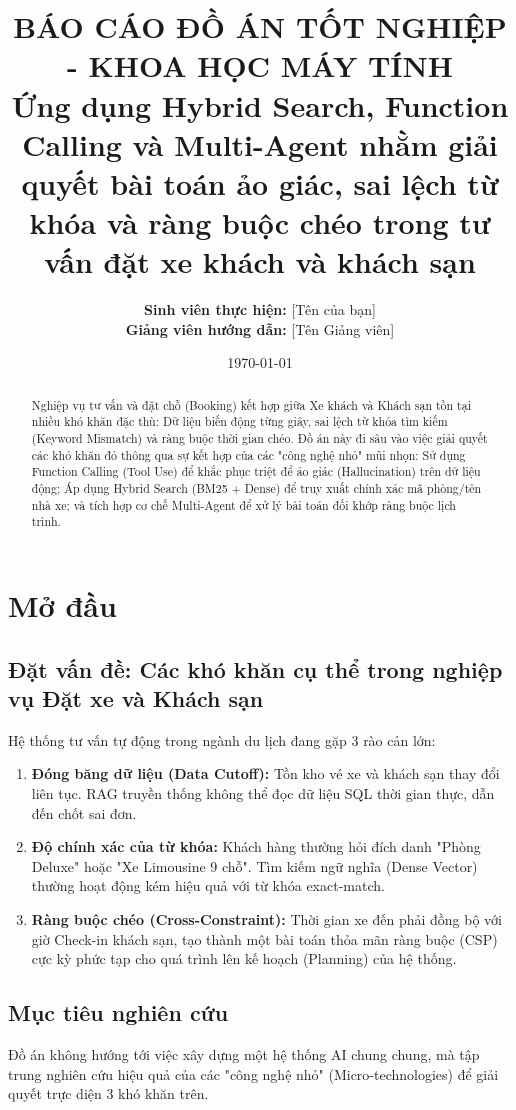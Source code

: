 \documentclass[12pt,a4paper]{report}
\title{\textbf{BÁO CÁO ĐỒ ÁN TỐT NGHIỆP - KHOA HỌC MÁY TÍNH}\\[1cm] 
\Large Ứng dụng Hybrid Search, Function Calling và Multi-Agent nhằm giải quyết bài toán ảo giác, sai lệch từ khóa và ràng buộc chéo trong tư vấn đặt xe khách và khách sạn}
\author{\textbf{Sinh viên thực hiện:} [Tên của bạn] \\ 
\textbf{Giảng viên hướng dẫn:} [Tên Giảng viên]}
\date{\today}
\begin{document}
\maketitle

\begin{abstract}
Nghiệp vụ tư vấn và đặt chỗ (Booking) kết hợp giữa Xe khách và Khách sạn tồn tại nhiều khó khăn đặc thù: Dữ liệu biến động từng giây, sai lệch từ khóa tìm kiếm (Keyword Mismatch) và ràng buộc thời gian chéo. Đồ án này đi sâu vào việc giải quyết các khó khăn đó thông qua sự kết hợp của các "công nghệ nhỏ" mũi nhọn: Sử dụng Function Calling (Tool Use) để khắc phục triệt để ảo giác (Hallucination) trên dữ liệu động; Áp dụng Hybrid Search (BM25 + Dense) để truy xuất chính xác mã phòng/tên nhà xe; và tích hợp cơ chế Multi-Agent để xử lý bài toán đối khớp ràng buộc lịch trình.
\end{abstract}

\tableofcontents

\chapter{Mở đầu}

\section{Đặt vấn đề: Các khó khăn cụ thể trong nghiệp vụ Đặt xe và Khách sạn}
Hệ thống tư vấn tự động trong ngành du lịch đang gặp 3 rào cản lớn:
\begin{enumerate}
    \item \textbf{Đóng băng dữ liệu (Data Cutoff):} Tồn kho vé xe và khách sạn thay đổi liên tục. RAG truyền thống không thể đọc dữ liệu SQL thời gian thực, dẫn đến chốt sai đơn.
    \item \textbf{Độ chính xác của từ khóa:} Khách hàng thường hỏi đích danh "Phòng Deluxe" hoặc "Xe Limousine 9 chỗ". Tìm kiếm ngữ nghĩa (Dense Vector) thường hoạt động kém hiệu quả với từ khóa exact-match.
    \item \textbf{Ràng buộc chéo (Cross-Constraint):} Thời gian xe đến phải đồng bộ với giờ Check-in khách sạn, tạo thành một bài toán thỏa mãn ràng buộc (CSP) cực kỳ phức tạp cho quá trình lên kế hoạch (Planning) của hệ thống.
\end{enumerate}

\section{Mục tiêu nghiên cứu}
Đồ án không hướng tới việc xây dựng một hệ thống AI chung chung, mà tập trung nghiên cứu hiệu quả của các "công nghệ nhỏ" (Micro-technologies) để giải quyết trực diện 3 khó khăn trên.
\end{document}

